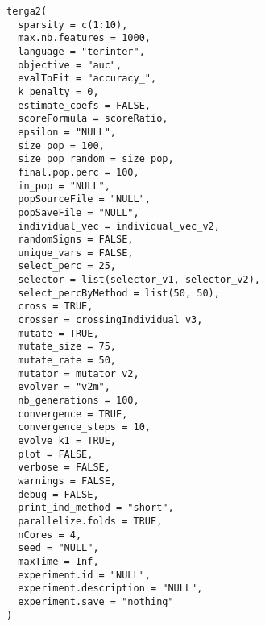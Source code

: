 \documentclass[a4paper]{book}
\begin{document}
%
\begin{Usage}
\begin{verbatim}
terga2(
  sparsity = c(1:10),
  max.nb.features = 1000,
  language = "terinter",
  objective = "auc",
  evalToFit = "accuracy_",
  k_penalty = 0,
  estimate_coefs = FALSE,
  scoreFormula = scoreRatio,
  epsilon = "NULL",
  size_pop = 100,
  size_pop_random = size_pop,
  final.pop.perc = 100,
  in_pop = "NULL",
  popSourceFile = "NULL",
  popSaveFile = "NULL",
  individual_vec = individual_vec_v2,
  randomSigns = FALSE,
  unique_vars = FALSE,
  select_perc = 25,
  selector = list(selector_v1, selector_v2),
  select_percByMethod = list(50, 50),
  cross = TRUE,
  crosser = crossingIndividual_v3,
  mutate = TRUE,
  mutate_size = 75,
  mutate_rate = 50,
  mutator = mutator_v2,
  evolver = "v2m",
  nb_generations = 100,
  convergence = TRUE,
  convergence_steps = 10,
  evolve_k1 = TRUE,
  plot = FALSE,
  verbose = FALSE,
  warnings = FALSE,
  debug = FALSE,
  print_ind_method = "short",
  parallelize.folds = TRUE,
  nCores = 4,
  seed = "NULL",
  maxTime = Inf,
  experiment.id = "NULL",
  experiment.description = "NULL",
  experiment.save = "nothing"
)
\end{verbatim}
\end{Usage}
%
\end{document}
